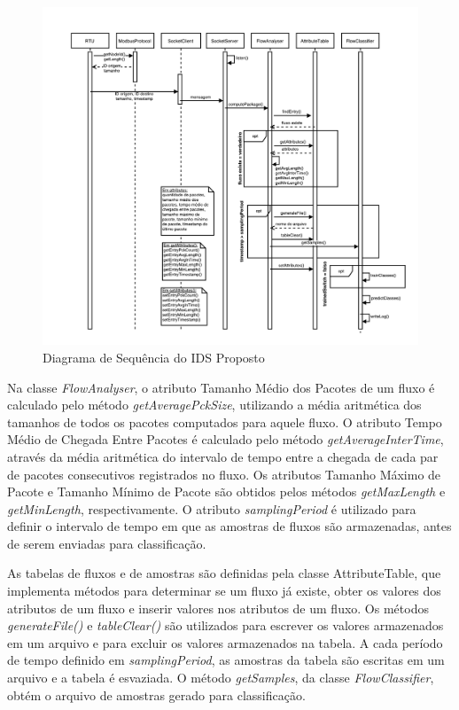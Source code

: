 \documentclass[cic,tc]{iiufrgs}
\begin{document}
\begin{figure}[h]
   \caption{Diagrama de Sequência do IDS Proposto}
   \begin{center}
       \includegraphics[width=36em]{sequencediagram}
   \end{center}
   \label{sequencediagram}
\end{figure}

Na classe \emph{FlowAnalyser}, o atributo Tamanho Médio dos Pacotes de um fluxo é calculado pelo método \emph{getAveragePckSize}, utilizando a média aritmética dos tamanhos de todos os pacotes computados para aquele fluxo. O atributo Tempo Médio de Chegada Entre Pacotes é calculado pelo método \emph{getAverageInterTime}, através da média aritmética do intervalo de tempo entre a chegada de cada par de pacotes consecutivos registrados no fluxo. Os atributos Tamanho Máximo de Pacote e Tamanho Mínimo de Pacote são obtidos pelos métodos \emph{getMaxLength} e \emph{getMinLength}, respectivamente. O atributo \emph{samplingPeriod} é utilizado para definir o intervalo de tempo em que as amostras de fluxos são armazenadas, antes de serem enviadas para classificação.

As tabelas de fluxos e de amostras são definidas pela classe AttributeTable, que implementa métodos para determinar se um fluxo já existe, obter os valores dos atributos de um fluxo e inserir valores nos atributos de um fluxo. Os métodos \emph{generateFile()} e \emph{tableClear()} são utilizados para escrever os valores armazenados em um arquivo e para excluir os valores armazenados na tabela. A cada período de tempo definido em \emph{samplingPeriod}, as amostras da tabela são escritas em um arquivo e a tabela é esvaziada. O método \emph{getSamples}, da classe \emph{FlowClassifier}, obtém o arquivo de amostras gerado para classificação.
\end{document}
